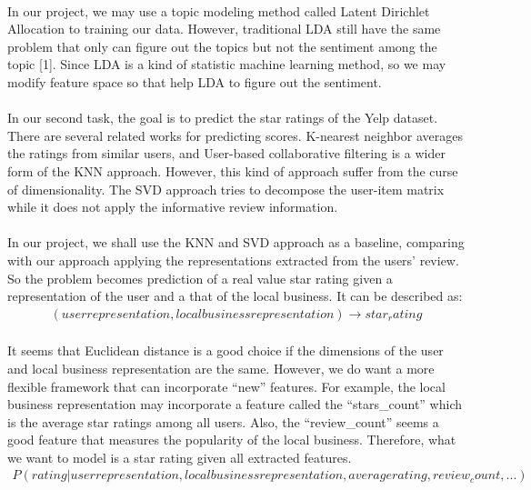 \documentclass{article}
\begin{document}
\paragraph{} In our project, we may use a topic modeling method called Latent Dirichlet Allocation to training our data. However, traditional LDA still have the same problem that only can figure out the topics but not the sentiment among the topic [1]. Since LDA is a kind of statistic machine learning method, so we may modify feature space so that help LDA to figure out the sentiment.

\paragraph{} In our second task, the goal is to predict the star ratings of the Yelp dataset. There are several related works for predicting scores. K-nearest neighbor averages the ratings from similar users, and User-based collaborative filtering is a wider form of the KNN approach. However, this kind of approach suffer from the curse of dimensionality. The SVD approach tries to decompose the user-item matrix while it does not apply the informative review information. 

\paragraph{} In our project, we shall use the KNN and SVD approach as a baseline, comparing with our approach applying the representations extracted from the users’ review. So the problem becomes prediction of a real value star rating given a representation of the user and a that of the local business. It can be described as:
\begin{align*}
(user representation,local business representation) \rightarrow star_rating
\end{align*}

\paragraph{} It seems that Euclidean distance is a good choice if the dimensions of the user and local business representation are the same. However, we do want a more flexible framework that can incorporate “new” features. For example, the local business representation may incorporate a feature called the “stars\_count” which is the average star ratings among all users. Also, the “review\_count” seems a good feature that measures the popularity of the local business. Therefore, what we want to model is a star rating given all extracted features.
\begin{align*}
P(rating | user representation, local business representation, average rating, review_count,...)
\end{align*}
\end{document}
